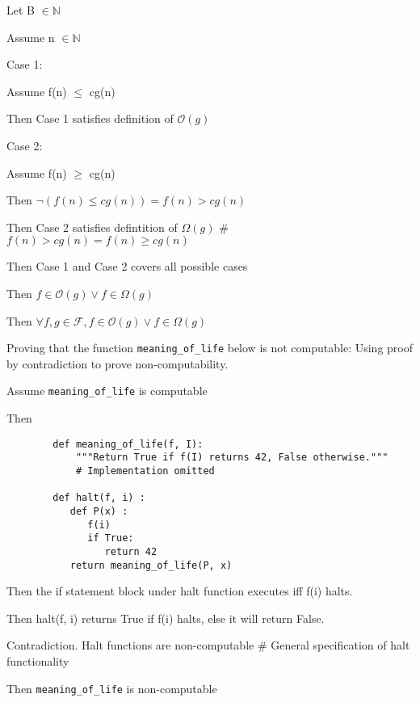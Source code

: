 \documentclass{article}
\begin{document}
\begin{enumerate}
\begin{description}
	\item Let B $\in \mathbb{N}$
	\item Assume n $\in \mathbb {N}$
	\begin{description}
		\item Case 1:
			\begin{description}
			\item Assume f(n) $\leq$ cg(n)
			\item Then Case 1 satisfies definition of $\mathcal{O}(g)$
			\end{description}
		\item Case 2:
		\item Then Case 1 and Case 2 covers all possible cases
	\end{description}
	\item Then $f\in\mathcal{O}(g) \vee f\in\Omega(g)$
	\item Then $\forall f, g\in\mathcal{F}, f\in\mathcal{O}(g) \vee f\in\Omega(g)$
\end {description}

\item Proving that the function \verb+meaning_of_life+ below is not computable:   %
Using proof by contradiction to prove non-computability. 
\begin{description}
	\item Assume  \verb+meaning_of_life+ is computable 
	\begin{description}
		\item Then 
		\begin{verbatim}
		def meaning_of_life(f, I):
		 	"""Return True if f(I) returns 42, False otherwise."""
			# Implementation omitted

		def halt(f, i) :
		   def P(x) :
		      f(i)
		      if True:
		         return 42
		   return meaning_of_life(P, x)
		\end{verbatim}
		\item Then the if statement block under halt function executes iff f(i) halts.
		\item Then halt(f, i) returns True if f(i) halts, else it will return False. 
		\item Contradiction. Halt functions are non-computable  \# General specification of halt functionality
	\end{description}
	\item Then  \verb+meaning_of_life+ is non-computable 


\end {description}
\end{enumerate}
\end{document}
